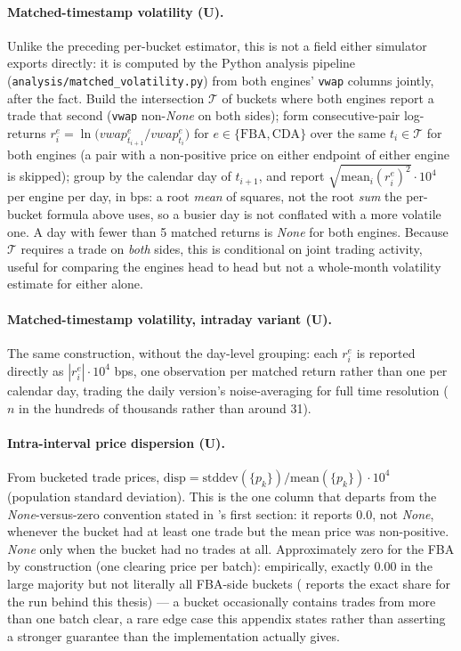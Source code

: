 \paragraph{Matched-timestamp volatility (U).} Unlike the preceding
per-bucket estimator, this is not a field either simulator exports
directly: it is computed by the Python analysis pipeline
(\texttt{analysis/matched\_volatility.py}) from both engines' \texttt{vwap}
columns jointly, after the fact. Build the intersection $\mathcal{T}$ of
buckets where both engines report a trade that second (\texttt{vwap}
non-\emph{None} on both sides); form consecutive-pair log-returns
$r^{e}_i = \ln\!\big(vwap^{e}_{t_{i+1}}/vwap^{e}_{t_i}\big)$ for
$e \in \{\text{FBA}, \text{CDA}\}$ over the same $t_i \in \mathcal{T}$ for
both engines (a pair with a non-positive price on either endpoint of
either engine is skipped); group by the calendar day of $t_{i+1}$, and
report $\sqrt{\mathrm{mean}_i(r^{e}_i)^2} \cdot 10^{4}$ per engine per
day, in bps: a root \emph{mean} of squares, not the root \emph{sum} the
per-bucket formula above uses, so a busier day is not conflated with a
more volatile one. A day with fewer than 5 matched returns is
\emph{None} for both engines. Because $\mathcal{T}$ requires a trade on
\emph{both} sides, this is conditional on joint trading activity, useful
for comparing the engines head to head but not a whole-month volatility
estimate for either alone.

\paragraph{Matched-timestamp volatility, intraday variant (U).} The same
construction, without the day-level grouping: each $r^{e}_i$ is reported
directly as $|r^{e}_i| \cdot 10^{4}$ bps, one observation per matched
return rather than one per calendar day, trading the daily version's
noise-averaging for full time resolution ($n$ in the hundreds of
thousands rather than around 31).

\paragraph{Intra-interval price dispersion (U).}
From bucketed trade prices, $\mathrm{disp} =
\mathrm{stddev}(\{p_k\})/\mathrm{mean}(\{p_k\}) \cdot 10^{4}$ (population
standard deviation). This is the one column that departs from the
\emph{None}-versus-zero convention stated in 's first
section: it reports $0.0$, not \emph{None}, whenever the bucket had at
least one trade but the mean price was non-positive. \emph{None} only
when the bucket had no trades at all. Approximately zero for the FBA by
construction (one clearing price per batch): empirically, exactly $0.00$
in the large majority but not literally all FBA-side buckets
( reports the exact share for the run behind this
thesis) --- a bucket occasionally contains trades from more than one
batch clear, a rare edge case this appendix states rather than asserting
a stronger guarantee than the implementation actually gives.

